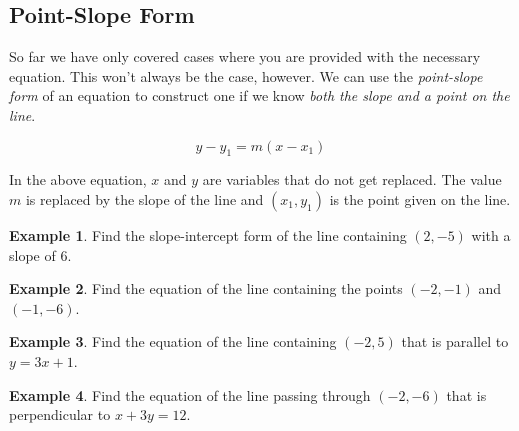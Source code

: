 \documentclass[addpoints,12pt]{exam}
\theoremstyle{definition}
\theoremstyle{break}
\theoremstyle{break}
\newtheorem{example}{Example}[subsection]
\begin{document}
\setcounter{section}{3}
\setcounter{subsection}{4}

\subsection{Point-Slope Form}

\vspace{.15in}

So far we have only covered cases where you are provided with the necessary equation. This won't always be the case, however. We can use the \emph{point-slope form} of an equation to construct one if we know \emph{both the slope and a point on the line}. 

\[y-y_1 = m(x-x_1)\]

In the above equation, $x$ and $y$ are variables that do not get replaced. The value $m$ is replaced by the slope of the line and $(x_1,y_1)$ is the point given on the line.

\vspace{.15in}

\begin{example}
Find the slope-intercept form of the line containing $(2,-5)$ with a slope of 6.
\vspace{2in}
\end{example}

\begin{example}
Find the equation of the line containing the points $(-2,-1)$ and $(-1,-6)$.
\end{example}

\newpage

\begin{example}
Find the equation of the line containing $(-2,5)$ that is parallel to $y = 3x + 1$.
\vspace{3.25in}
\end{example}

\begin{example}
Find the equation of the line passing through $(-2,-6)$ that is perpendicular to $x + 3y = 12$.
\end{example}
\end{document}
